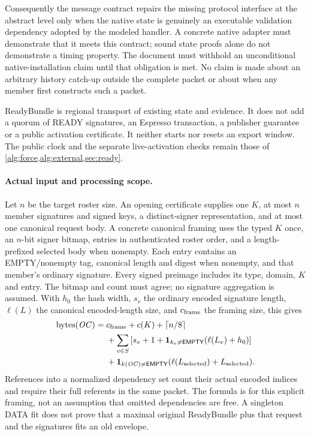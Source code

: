 Consequently the message contract repairs the missing protocol interface
at the abstract level only when the native state is genuinely an executable
validation dependency adopted by the modeled handler. A concrete native
adapter must demonstrate that it meets this contract; sound state proofs
alone do not demonstrate a timing property. The document must withhold
an unconditional native-installation claim until that obligation is met.
No claim is made about an arbitrary history catch-up outside the complete
packet or about when any member first constructs such a packet.

ReadyBundle is regional transport of existing state and evidence. It does
not add a quorum of READY signatures, an Espresso transaction, a publisher
guarantee or a public activation certificate. It neither starts nor resets
an export window. The public clock and the separate live-activation checks
remain those of \cref{alg:force,alg:external,sec:ready}.


\paragraph{Actual input and processing scope.}
\label{sec:input-resource-scope}
Let $n$ be the target roster size. An opening certificate supplies one
$K$, at most $n$ member signatures and signed keys, a distinct-signer
representation, and at most one canonical request body. A concrete
canonical framing uses the typed $K$ once, an $n$-bit signer bitmap,
entries in authenticated roster order, and a length-prefixed selected
body when nonempty. Each entry contains an EMPTY/nonempty tag, canonical
length and digest when nonempty, and that member's ordinary signature.
Every signed preimage includes its type, domain, $K$ and entry. The
bitmap and count must agree; no signature aggregation is assumed.
With $h_0$ the hash width, $s_v$ the ordinary encoded signature length,
$\ell(L)$ the canonical encoded-length size, and $c_{\rm frame}$ the
framing size, this gives
\[
\begin{split}
 \operatorname{bytes}(\mathit{OC})={}&c_{\rm frame}+c(K)+\lceil n/8\rceil\\
 &+\sum_{v\in S}\left[s_v+1+\mathbf 1_{k_v\ne\mathsf{EMPTY}}
                 (\ell(L_v)+h_0)\right]\\
 &+\mathbf 1_{k(\mathit{OC})\ne\mathsf{EMPTY}}
                 (\ell(L_{\rm selected})+L_{\rm selected}).
\end{split}
\]
References into a normalized dependency set count their actual encoded
indices and require their full referents in the same packet. The formula
is for this explicit framing, not an assumption that omitted dependencies
are free. A singleton DATA fit does not prove that a maximal original
ReadyBundle plus that request and the signatures fits an old envelope.

